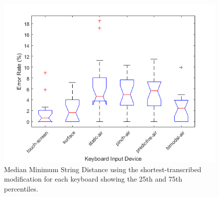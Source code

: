 \begin{figure}[t]
	\centering
	\includegraphics{Figures/fig_MSD_short_boxplot}
	\caption[Minimum String Distance Boxplot for Modified-shortest]{Median Minimum String Distance using the shortest-transcribed modification for each keyboard showing the 25th and 75th percentiles.}
	\label{fig_MSD_short_boxplot}
\end{figure}

